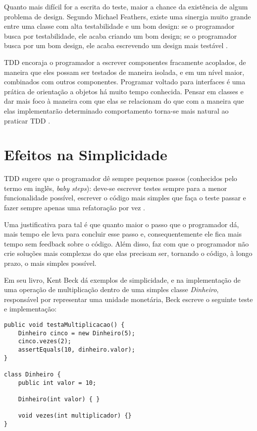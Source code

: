 Quanto mais difícil for a escrita do teste, maior a chance da existência de
algum problema de design. Segundo Michael Feathers, existe uma sinergia muito
grande entre uma classe com alta testabilidade e um bom design: se o
programador busca por testabilidade, ele acaba criando um bom design; se o
programador busca por um bom design, ele acaba escrevendo um design mais
testável \cite{feathers-synergy}.

TDD encoraja o programador a escrever componentes fracamente acoplados, de
maneira que eles possam ser testados de maneira isolada, e em um nível maior,
combinados com outros componentes.
Programar voltado para interfaces é uma prática de orientação a objetos há muito
tempo conhecida. Pensar em classes e dar mais foco à maneira com que
elas se relacionam do que com a maneira que elas implementarão determinado
comportamento torna-se mais natural ao praticar TDD \cite{GOOS}. 

\section{Efeitos na Simplicidade}

TDD sugere que o programador dê sempre pequenos passos (conhecidos pelo termo em
inglês, \textit{baby steps}): deve-se escrever testes sempre para a menor
funcionalidade possível, escrever o código mais simples que faça o teste passar
e fazer sempre apenas uma refatoração por vez \cite{TDDByExample}.

Uma justificativa para tal é que quanto maior o passo que o programador dá, mais
tempo ele leva para concluir esse passo e, consequentemente ele fica mais tempo
sem feedback sobre o código. Além disso, faz com que o programador não crie
soluções mais complexas do que elas precisam ser, tornando o código, à longo
prazo, o mais simples possível.

Em seu livro, Kent Beck \cite{TDDByExample} dá exemplos de simplicidade, e na
implementação de uma operação de multiplicação dentro de uma simples classe 
\textit{Dinheiro}, responsável por representar uma unidade monetária, Beck 
escreve o seguinte teste e implementação:

\begin{lstlisting}[frame=trbl]
public void testaMultiplicacao() {
	Dinheiro cinco = new Dinheiro(5);
	cinco.vezes(2);
	assertEquals(10, dinheiro.valor);
}
	
class Dinheiro {
	public int valor = 10;
		
	Dinheiro(int valor) { }
		
	void vezes(int multiplicador) {}
}
\end{lstlisting}


